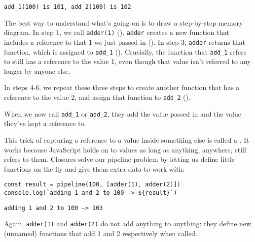 \begin{verbatim}
add_1(100) is 101, add_2(100) is 102
\end{verbatim}

The best way to understand what's going on is to draw a step-by-step memory diagram.
In step 1, we call \texttt{adder(1)}
().
\texttt{adder} creates a new function that includes a reference to that 1 we just passed in
().
In step 3,
\texttt{adder} returns that function, which is assigned to \texttt{add\_1}
().
Crucially,
the function that \texttt{add\_1} refers to still has a reference to the value 1,
even though that value isn't referred to any longer by anyone else.




In steps 4-6,
we repeat these three steps to create another function that has a reference to the value 2,
and assign that function to \texttt{add\_2}
().


When we now call \texttt{add\_1} or \texttt{add\_2},
they add the value passed in and the value they've kept a reference to.

This trick of capturing a reference to a value inside something else
is called a .
It works because JavaScript holds on to values as long as anything,
anywhere,
still refers to them.
Closures solve our pipeline problem by letting us define little functions
on the fly
and give them extra data to work with:

\begin{verbatim}
const result = pipeline(100, [adder(1), adder(2)])
console.log(`adding 1 and 2 to 100 -> ${result}`)
\end{verbatim}

\begin{verbatim}
adding 1 and 2 to 100 -> 103
\end{verbatim}

Again, \texttt{adder(1)} and \texttt{adder(2)} do not add anything to anything:
they define new (unnamed) functions that add 1 and 2 respectively when called.


